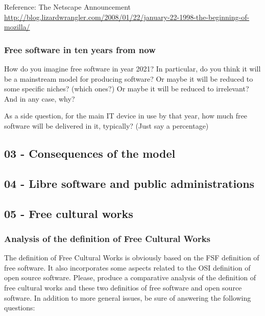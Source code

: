 \documentclass[a4paper]{article}
\begin{document}
Reference: The Netscape Announcement \\
\url{http://blog.lizardwrangler.com/2008/01/22/january-22-1998-the-beginning-of-mozilla/}

\subsubsection{Free software in ten years from now}
\label{exe:10-years}

How do you imagine free software in year 2021? In particular, do you think it will be a mainstream model for producing software? Or maybe it will be reduced to some specific niches? (which ones?) Or maybe it will be reduced to irrelevant? And in any case, why?

As a side question, for the main IT device in use by that year, how much free software will be delivered in it, typically? (Just say a percentage)


\subsection{03 - Consequences of the model}


\subsection{04 - Libre software and public administrations}


\subsection{05 - Free cultural works}

\subsubsection{Analysis of the definition of Free Cultural Works}
\label{exe:defintion-free-cultural-works}

The definition of Free Cultural Works is obviously based on the FSF definition of free software. It also incorporates some aspects related to the OSI definition of open source software. Please, produce a comparative analysis of the definition of free cultural works and these two definitios of free software and open source software. In addition to more general issues, be sure of answering the following questions:
\end{document}
